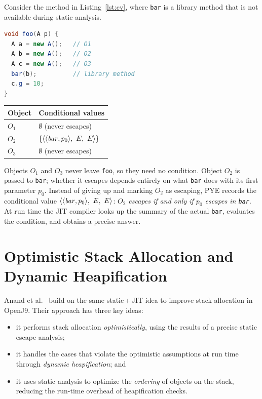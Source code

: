 Consider the method in Listing~\ref{lst:cv}, where \texttt{bar} is a library method that is not
available during static analysis.

\begin{minipage}[t]{0.47\textwidth}
\begin{lstlisting}[language=Java, caption={Example for conditional values.}, label={lst:cv}]
void foo(A p) {
  A a = new A();   // O1
  A b = new A();   // O2
  A c = new A();   // O3
  bar(b);          // library method
  c.g = 10;
}
\end{lstlisting}
\end{minipage}\hfill
\begin{minipage}[t]{0.48\textwidth}
\vspace{10pt}
\centering
\begin{tabular}{@{}ll@{}}
  \toprule
  Object & Conditional values \\
  \midrule
  $O_1$ & $\emptyset$ \quad (never escapes) \\
  $O_2$ & $\{\langle \langle \mathit{bar}, p_0\rangle,\ E,\ E\rangle\}$ \\
  $O_3$ & $\emptyset$ \quad (never escapes) \\
  \bottomrule
\end{tabular}
\end{minipage}

\medskip
Objects $O_1$ and $O_3$ never leave \texttt{foo}, so they need no condition. Object $O_2$ is
passed to \texttt{bar}; whether it escapes depends entirely on what \texttt{bar} does with its
first parameter $p_0$. Instead of giving up and marking $O_2$ as escaping, PYE records the
conditional value $\langle \langle \mathit{bar}, p_0\rangle,\ E,\ E\rangle$: \emph{$O_2$ escapes if and
only if $p_0$ escapes in \texttt{bar}}. At run time the JIT compiler looks up the summary of the
actual \texttt{bar}, evaluates the condition, and obtains a precise answer.

\section{Optimistic Stack Allocation and Dynamic Heapification}

Anand et al.~\cite{anand2024optimistic} build on the same static\,+\,JIT idea to improve stack
allocation in OpenJ9. Their approach has three key ideas:
\begin{itemize}
  \item it performs stack allocation \emph{optimistically}, using the results of a precise
        static escape analysis;
  \item it handles the cases that violate the optimistic assumptions at run time through
        \emph{dynamic heapification}; and
  \item it uses static analysis to optimize the \emph{ordering} of objects on the stack, reducing
        the run-time overhead of heapification checks.
\end{itemize}

